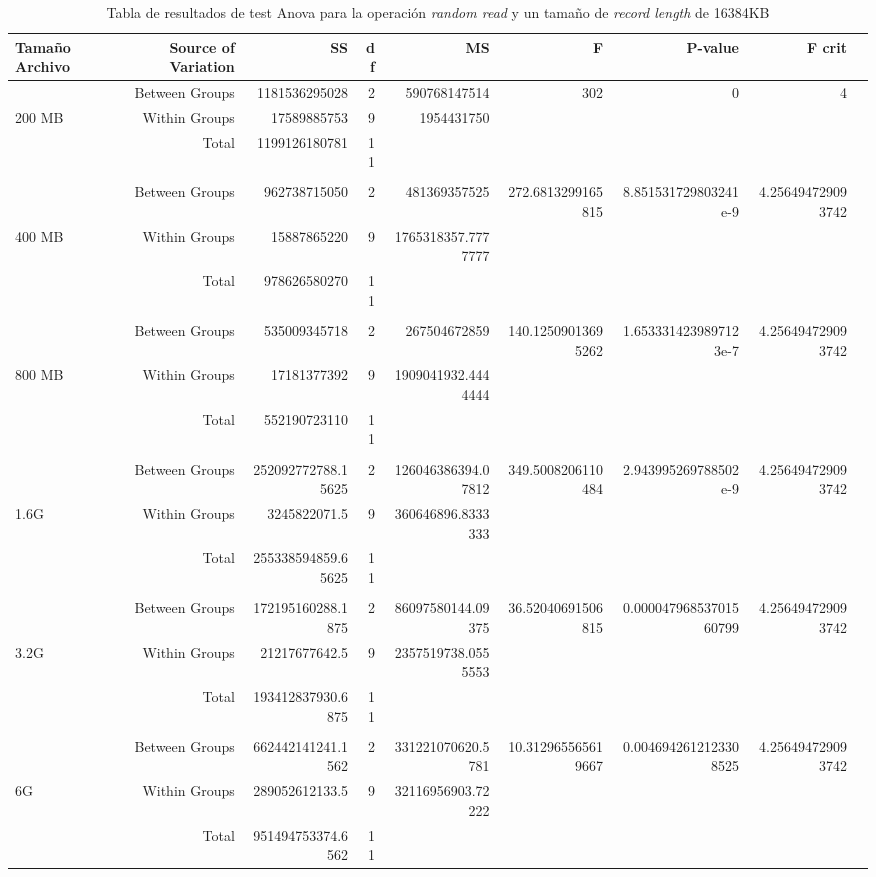 \begin{landscape}
\begin{table}[!htp]\centering
\caption{Tabla de resultados de test Anova para la operación \textit{random read} y un tamaño de \textit{record length} de 16384KB}\label{tab: }
\scriptsize
\begin{tabular}{lrrrrrrrr}\toprule
Tamaño Archivo &Source of Variation &SS &df &MS &F &P-value &F crit \\\midrule
&Between Groups &1181536295028 &2 &590768147514 &302 &0 &4 \\
200 MB &Within Groups &17589885753 &9 &1954431750 & & & \\
&Total &1199126180781 &11 & & & & \\
& & & & & & & \\
&Between Groups &962738715050 &2 &481369357525 &272.6813299165815 &8.851531729803241e-9 &4.256494729093742 \\
400 MB &Within Groups &15887865220 &9 &1765318357.7777777 & & & \\
&Total &978626580270 &11 & & & & \\
& & & & & & & \\
&Between Groups &535009345718 &2 &267504672859 &140.12509013695262 &1.6533314239897123e-7 &4.256494729093742 \\
800 MB &Within Groups &17181377392 &9 &1909041932.4444444 & & & \\
&Total &552190723110 &11 & & & & \\
& & & & & & & \\
&Between Groups &252092772788.15625 &2 &126046386394.07812 &349.5008206110484 &2.943995269788502e-9 &4.256494729093742 \\
1.6G &Within Groups &3245822071.5 &9 &360646896.8333333 & & & \\
&Total &255338594859.65625 &11 & & & & \\
& & & & & & & \\
&Between Groups &172195160288.1875 &2 &86097580144.09375 &36.52040691506815 &0.00004796853701560799 &4.256494729093742 \\
3.2G &Within Groups &21217677642.5 &9 &2357519738.0555553 & & & \\
&Total &193412837930.6875 &11 & & & & \\
& & & & & & & \\
&Between Groups &662442141241.1562 &2 &331221070620.5781 &10.312965565619667 &0.0046942612123308525 &4.256494729093742 \\
6G &Within Groups &289052612133.5 &9 &32116956903.72222 & & & \\
&Total &951494753374.6562 &11 & & & & \\
\bottomrule
\end{tabular}
\end{table}
\end{landscape}


